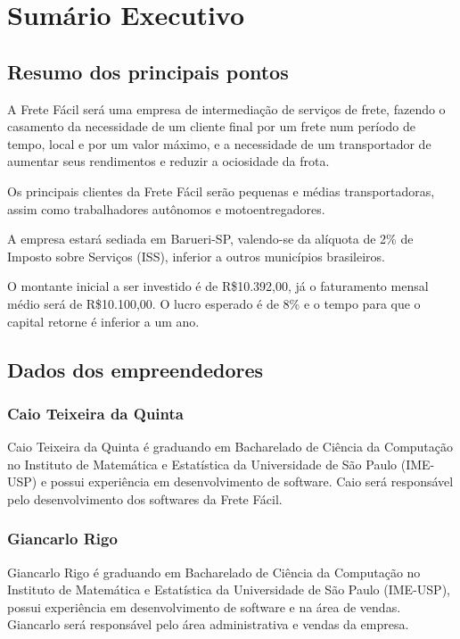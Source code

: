 \chapter{Sumário Executivo}\label{sumario}

\section{Resumo dos principais pontos}
A Frete Fácil será uma empresa de intermediação de serviços de frete, fazendo o casamento da necessidade de um cliente final por um frete num período de tempo, local e por um valor máximo, e a necessidade de um transportador de aumentar seus rendimentos e reduzir a ociosidade da frota.\newline

Os principais clientes da Frete Fácil serão pequenas e médias transportadoras, assim como trabalhadores autônomos e motoentregadores.\newline

A empresa estará sediada em Barueri-SP, valendo-se da alíquota de 2\% de Imposto sobre Serviços (ISS), inferior a outros municípios brasileiros.\newline

O montante inicial a ser investido é de R\$10.392,00, já o faturamento mensal médio será de R\$10.100,00.
O lucro esperado é de 8\% e o tempo para que o capital retorne é inferior a um ano.\newline

\section{Dados dos empreendedores}
\subsection{Caio Teixeira da Quinta}
  Caio Teixeira da Quinta é graduando em Bacharelado de Ciência da Computação no Instituto de Matemática e Estatística da Universidade de São Paulo (IME-USP) e possui experiência em desenvolvimento de software. Caio será responsável pelo desenvolvimento dos softwares da Frete Fácil.

\subsection{Giancarlo Rigo}
  Giancarlo Rigo é graduando em Bacharelado de Ciência da Computação no Instituto de Matemática e Estatística da Universidade de São Paulo (IME-USP), possui experiência em desenvolvimento de software e na área de vendas. Giancarlo será responsável pelo área administrativa e vendas da empresa.

